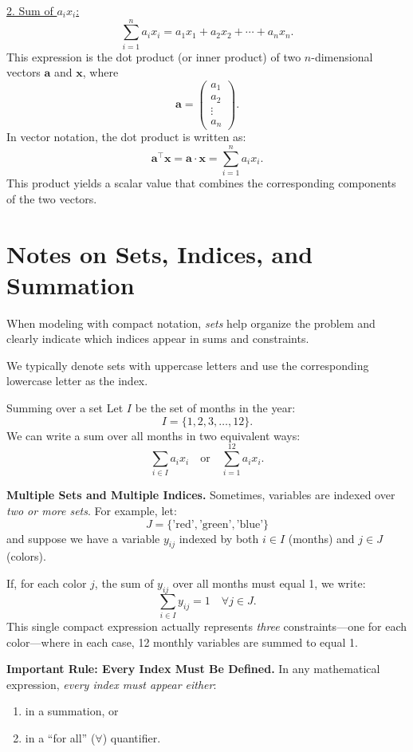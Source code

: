 \underline{2. Sum of \(a_i x_i\):}
\[
\sum_{i=1}^{n} a_i x_i = a_1x_1 + a_2x_2 + \cdots + a_nx_n.
\]
This expression is the dot product (or inner product) of two \(n\)-dimensional vectors \(\mathbf{a}\) and \(\mathbf{x}\), where
\[
\mathbf{a} = \begin{pmatrix} a_1 \\ a_2 \\ \vdots \\ a_n \end{pmatrix}.
\]
In vector notation, the dot product is written as:
\[
\mathbf{a}^\top \mathbf{x} = \mathbf{a} \cdot \mathbf{x} = \sum_{i=1}^{n} a_i x_i.
\]
This product yields a scalar value that combines the corresponding components of the two vectors.

\section*{Notes on Sets, Indices, and Summation}

When modeling with compact notation, \emph{sets} help organize the problem and clearly indicate which indices appear in sums and constraints.

We typically denote sets with uppercase letters and use the corresponding lowercase letter as the index.  

\begin{example}{Summing over a set}{}
Let \( I \) be the set of months in the year:
\[
I = \{1, 2, 3, \dots, 12\}.
\]
We can write a sum over all months in two equivalent ways:
\[
\sum_{i \in I} a_i x_i \quad\text{or}\quad \sum_{i=1}^{12} a_i x_i.
\]
\end{example}

\medskip
\noindent
\textbf{Multiple Sets and Multiple Indices.}  
Sometimes, variables are indexed over \emph{two or more sets}.  
For example, let:
\[
J = \{\text{'red'}, \text{'green'}, \text{'blue'}\}
\]
and suppose we have a variable \( y_{ij} \) indexed by both \( i \in I \) (months) and \( j \in J \) (colors).

If, for each color \( j \), the sum of \( y_{ij} \) over all months must equal 1, we write:
\[
\sum_{i \in I} y_{ij} = 1 \quad \forall j \in J.
\]
This single compact expression actually represents \emph{three} constraints—one for each color—where in each case, 12 monthly variables are summed to equal 1.

\medskip
\noindent
\textbf{Important Rule: Every Index Must Be Defined.}  
In any mathematical expression, \emph{every index must appear either}:
\begin{enumerate}
    \item in a summation, or  
    \item in a ``for all'' (\(\forall\)) quantifier.
\end{enumerate}

